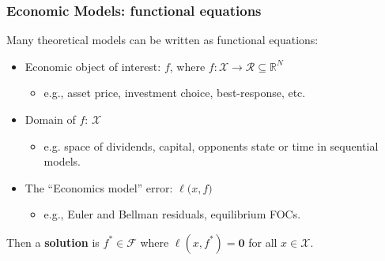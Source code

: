 \documentclass[aspectratio=169,10pt]{beamer}
\newcommand{\emphcolor}[1]{\textbf{\textcolor{emphcolorval}{#1}}}
\newcommand{\Xdom}{\mathcal{X}}
\newcommand{\F}{\mathcal{F}}
\begin{document}
\begin{frame}
	\frametitle{Economic Models: functional equations}
	Many theoretical models can be written as functional equations:
	\begin{itemize}
		\item Economic object of interest: $f $, where $f : \Xdom\to \mathcal{R}\subseteq \mathbb{R}^N$ 
		\begin{itemize}
			\item e.g., asset price, investment choice, best-response, etc.
		\end{itemize}
			\vspace{0.1in}
		\item Domain of $f$: $\Xdom$  
		\begin{itemize}
			\item e.g. space of dividends, capital, opponents state or time in sequential models.
		\end{itemize}
			\vspace{0.1in}
		\item The ``Economics model'' error:  $\ell \big(x,f\big)$  
		\begin{itemize}
			\item e.g., Euler and Bellman residuals, equilibrium FOCs.
		\end{itemize}
		\vspace{0.1in}
	\end{itemize}
	Then a \emphcolor{solution} is $f^*\in \F$ where $\ell(x,f^*) = \mathbf{0}$ for all $x \in \Xdom$.\vspace{0.1in}
\end{frame}
\end{document}
